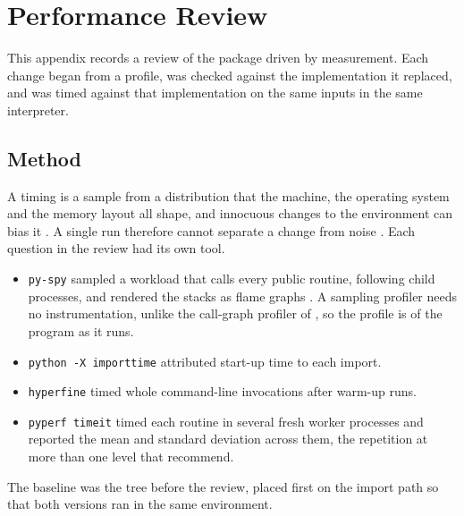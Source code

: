 \chapter{Performance Review}
\label{app:performance}


This appendix records a review of the package driven by measurement. Each
change began from a profile, was checked against the implementation it
replaced, and was timed against that implementation on the same inputs in the
same interpreter.

\section{Method}
\label{app:performance:method}

A timing is a sample from a distribution that the machine, the operating
system and the memory layout all shape, and innocuous changes to the
environment can bias it \citep{mytkowicz_producing_2009}. A single run
therefore cannot separate a change from noise
\citep{georges_statistically_2007,kalibera_rigorous_2013}. Each question in
the review had its own tool.

\begin{itemize}
  \item \texttt{py-spy} sampled a workload that calls every public routine,
    following child processes, and rendered the stacks as flame graphs
    \citep{gregg_flame_2016}. A sampling profiler needs no instrumentation,
    unlike the call-graph profiler of \citet{graham_gprof_1982}, so the
    profile is of the program as it runs.
  \item \texttt{python -X importtime} attributed start-up time to each
    import.
  \item \texttt{hyperfine} timed whole command-line invocations after
    warm-up runs.
  \item \texttt{pyperf timeit} timed each routine in several fresh worker
    processes and reported the mean and standard deviation across them, the
    repetition at more than one level that \citet{kalibera_rigorous_2013}
    recommend.
\end{itemize}

The baseline was the tree before the review, placed first on the import path
so that both versions ran in the same environment.

